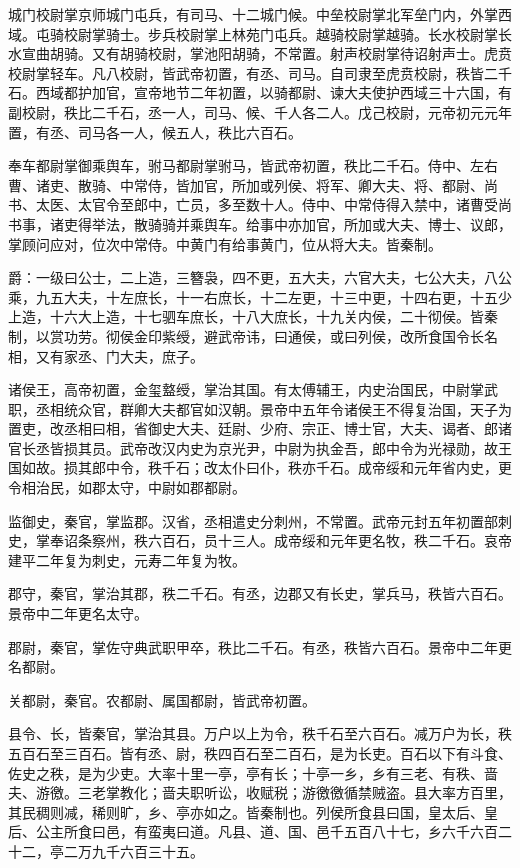 \documentclass[12pt,UTF8]{ctexbook}
\begin{document}
城门校尉掌京师城门屯兵，有司马、十二城门候。中垒校尉掌北军垒门内，外掌西域。屯骑校尉掌骑士。步兵校尉掌上林苑门屯兵。越骑校尉掌越骑。长水校尉掌长水宣曲胡骑。又有胡骑校尉，掌池阳胡骑，不常置。射声校尉掌待诏射声士。虎贲校尉掌轻车。凡八校尉，皆武帝初置，有丞、司马。自司隶至虎贲校尉，秩皆二千石。西域都护加官，宣帝地节二年初置，以骑都尉、谏大夫使护西域三十六国，有副校尉，秩比二千石，丞一人，司马、候、千人各二人。戊己校尉，元帝初元元年置，有丞、司马各一人，候五人，秩比六百石。



奉车都尉掌御乘舆车，驸马都尉掌驸马，皆武帝初置，秩比二千石。侍中、左右曹、诸吏、散骑、中常侍，皆加官，所加或列侯、将军、卿大夫、将、都尉、尚书、太医、太官令至郎中，亡员，多至数十人。侍中、中常侍得入禁中，诸曹受尚书事，诸吏得举法，散骑骑并乘舆车。给事中亦加官，所加或大夫、博士、议郎，掌顾问应对，位次中常侍。中黄门有给事黄门，位从将大夫。皆秦制。



爵：一级曰公士，二上造，三簪袅，四不更，五大夫，六官大夫，七公大夫，八公乘，九五大夫，十左庶长，十一右庶长，十二左更，十三中更，十四右更，十五少上造，十六大上造，十七驷车庶长，十八大庶长，十九关内侯，二十彻侯。皆秦制，以赏功劳。彻侯金印紫绶，避武帝讳，曰通侯，或曰列侯，改所食国令长名相，又有家丞、门大夫，庶子。



诸侯王，高帝初置，金玺盩绶，掌治其国。有太傅辅王，内史治国民，中尉掌武职，丞相统众官，群卿大夫都官如汉朝。景帝中五年令诸侯王不得复治国，天子为置吏，改丞相曰相，省御史大夫、廷尉、少府、宗正、博士官，大夫、谒者、郎诸官长丞皆损其员。武帝改汉内史为京光尹，中尉为执金吾，郎中令为光禄勋，故王国如故。损其郎中令，秩千石；改太仆曰仆，秩亦千石。成帝绥和元年省内史，更令相治民，如郡太守，中尉如郡都尉。



监御史，秦官，掌监郡。汉省，丞相遣史分刺州，不常置。武帝元封五年初置部刺史，掌奉诏条察州，秩六百石，员十三人。成帝绥和元年更名牧，秩二千石。哀帝建平二年复为刺史，元寿二年复为牧。



郡守，秦官，掌治其郡，秩二千石。有丞，边郡又有长史，掌兵马，秩皆六百石。景帝中二年更名太守。



郡尉，秦官，掌佐守典武职甲卒，秩比二千石。有丞，秩皆六百石。景帝中二年更名都尉。



关都尉，秦官。农都尉、属国都尉，皆武帝初置。



县令、长，皆秦官，掌治其县。万户以上为令，秩千石至六百石。减万户为长，秩五百石至三百石。皆有丞、尉，秩四百石至二百石，是为长吏。百石以下有斗食、佐史之秩，是为少吏。大率十里一亭，亭有长；十亭一乡，乡有三老、有秩、啬夫、游徼。三老掌教化；啬夫职听讼，收赋税；游徼徼循禁贼盗。县大率方百里，其民稠则减，稀则旷，乡、亭亦如之。皆秦制也。列侯所食县曰国，皇太后、皇后、公主所食曰邑，有蛮夷曰道。凡县、道、国、邑千五百八十七，乡六千六百二十二，亭二万九千六百三十五。
\end{document}
